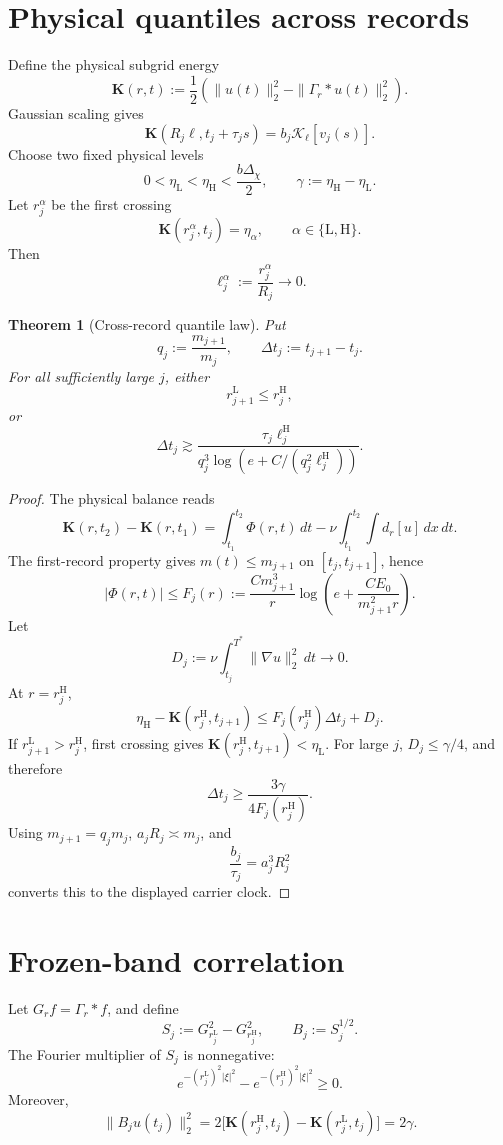 \documentclass[11pt]{article}
\newtheorem{theorem}{Theorem}
\theoremstyle{definition}
\theoremstyle{remark}
\newcommand{\K}{\mathbf{K}}
\newcommand{\cK}{\mathcal{K}}
\begin{document}
\section{Physical quantiles across records}

Define the physical subgrid energy
\[
 \K(r,t)
 :=\frac12\left(
 \|u(t)\|_2^2-\|\Gamma_r*u(t)\|_2^2
 \right).
\]
Gaussian scaling gives
\[
 \K(R_j\ell,t_j+\tau_js)
 =b_j\cK_\ell[v_j(s)].
\]
Choose two fixed physical levels
\[
 0<\eta_{\mathrm L}<\eta_{\mathrm H}<\frac{b\Delta_\chi}{2},
 \qquad
 \gamma:=\eta_{\mathrm H}-\eta_{\mathrm L}.
\]
Let \(r_j^\alpha\) be the first crossing
\[
 \K(r_j^\alpha,t_j)=\eta_\alpha,
 \qquad \alpha\in\{\mathrm L,\mathrm H\}.
\]
Then
\[
 \ell_j^\alpha:=\frac{r_j^\alpha}{R_j}\to0.
\]

\begin{theorem}[Cross-record quantile law]
Put
\[
 q_j:=\frac{m_{j+1}}{m_j},
 \qquad \Delta t_j:=t_{j+1}-t_j.
\]
For all sufficiently large \(j\), either
\[
 r_{j+1}^{\mathrm L}\le r_j^{\mathrm H},
\]
or
\[
 \Delta t_j
 \gtrsim
 \frac{\tau_j\ell_j^{\mathrm H}}
 {q_j^3\log(e+C/(q_j^2\ell_j^{\mathrm H}))}.
\]
\end{theorem}

\begin{proof}
The physical balance reads
\[
 \K(r,t_2)-\K(r,t_1)
 =
 \int_{t_1}^{t_2}\Phi(r,t)\,dt
 -
 \nu\int_{t_1}^{t_2}\!\!\int d_r[u]\,dx\,dt.
\]
The first-record property gives \(m(t)\le m_{j+1}\) on
\([t_j,t_{j+1}]\), hence
\[
 |\Phi(r,t)|
 \le
 F_j(r):=
 \frac{Cm_{j+1}^3}{r}
 \log\!\left(e+\frac{CE_0}{m_{j+1}^2r}\right).
\]
Let
\[
 D_j:=\nu\int_{t_j}^{T^*}\|\nabla u\|_2^2\,dt\to0.
\]
At \(r=r_j^{\mathrm H}\),
\[
 \eta_{\mathrm H}-\K(r_j^{\mathrm H},t_{j+1})
 \le F_j(r_j^{\mathrm H})\Delta t_j+D_j.
\]
If \(r_{j+1}^{\mathrm L}>r_j^{\mathrm H}\), first crossing gives
\(\K(r_j^{\mathrm H},t_{j+1})<\eta_{\mathrm L}\).  For large \(j\),
\(D_j\le\gamma/4\), and therefore
\[
 \Delta t_j\ge\frac{3\gamma}{4F_j(r_j^{\mathrm H})}.
\]
Using \(m_{j+1}=q_jm_j\), \(a_jR_j\asymp m_j\), and
\[
 \frac{b_j}{\tau_j}=a_j^3R_j^2
\]
converts this to the displayed carrier clock.
\end{proof}

\section{Frozen-band correlation}

Let \(G_rf=\Gamma_r*f\), and define
\[
 S_j:=G_{r_j^{\mathrm L}}^2-G_{r_j^{\mathrm H}}^2,
 \qquad B_j:=S_j^{1/2}.
\]
The Fourier multiplier of \(S_j\) is nonnegative:
\[
 e^{-(r_j^{\mathrm L})^2|\xi|^2}
 -
 e^{-(r_j^{\mathrm H})^2|\xi|^2}\ge0.
\]
Moreover,
\[
 \|B_ju(t_j)\|_2^2
 =2\bigl[\K(r_j^{\mathrm H},t_j)-\K(r_j^{\mathrm L},t_j)\bigr]
 =2\gamma.
\]
\end{document}
